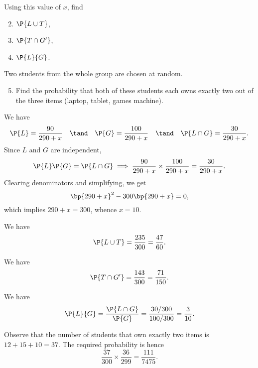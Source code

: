 \begin{problem}
    Using this value of $x$, find
    \begin{enumerate}
        \setcounter{enumi}{1}
        \item $\P{L \cup T}$,
        \item $\P{T \cap G'}$,
        \item $\P{L}{G}$.
    \end{enumerate}

    Two students from the whole group are chosen at random.
    
    \begin{enumerate}
        \setcounter{enumi}{4}
        \item Find the probability that both of these students each owns exactly two out of the three items (laptop, tablet, games machine).
    \end{enumerate}
\end{problem}
\begin{solution}
    \begin{ppart}
        We have \[\P{L} = \frac{90}{290 + x} \quad \tand \quad \P{G} = \frac{100}{290 + x} \quad \tand \quad \P{L \cap G} = \frac{30}{290 + x}.\] Since $L$ and $G$ are independent, \[\P{L}\P{G} = \P{L \cap G} \implies \frac{90}{290 + x} \times \frac{100}{290 + x} = \frac{30}{290 + x}.\] Clearing denominators and simplifying, we get \[\bp{290 + x}^2 - 300 \bp{290 + x} = 0,\] which implies $290 + x = 300$, whence $x = 10$.
    \end{ppart}
    \begin{ppart}
        We have \[\P{L \cup T} = \frac{235}{300} = \frac{47}{60}.\]
    \end{ppart}
    \begin{ppart}
        We have \[\P{T \cap G'} = \frac{143}{300} = \frac{71}{150}.\]
    \end{ppart}
    \begin{ppart}
        We have \[\P{L}{G} = \frac{\P{L \cap G}}{\P{G}} = \frac{30/300}{100/300} = \frac{3}{10}.\]
    \end{ppart}
    \begin{ppart}
        Observe that the number of students that own exactly two items is $12 + 15 + 10 = 37$. The required probability is hence \[\frac{37}{300} \times \frac{36}{299} = \frac{111}{7475}.\]
    \end{ppart}
\end{solution}

